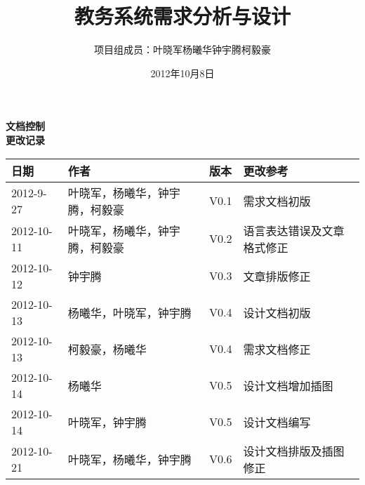 \documentclass[a4paper,12pt]{article}
\begin{document}
\begin{CJK*}{UTF8}{stzhongsong}

\title{教务系统需求分析与设计}
\author{项目组成员：叶晓军\quad 杨曦华\quad 钟宇腾\quad 柯毅豪}
\date{2012年10月8日}



\noindent \textbf{\LARGE 文档控制}\\

\noindent \textbf{\large 更改记录}\\

\begin{tabularx}{\textwidth}{|l|l|l|X|}
  \hline
  \textbf{日期} & \textbf{作者} & \textbf{版本} & \textbf{更改参考}\\
  \hline
  2012-9-27&叶晓军，杨曦华，钟宇腾，柯毅豪&V0.1&需求文档初版\\
  \hline
  2012-10-11&叶晓军，杨曦华，钟宇腾，柯毅豪&V0.2&语言表达错误及文章格式修正\\
  \hline
  2012-10-12&钟宇腾&V0.3&文章排版修正\\
  \hline
  2012-10-13&杨曦华，叶晓军，钟宇腾&V0.4&设计文档初版\\
  \hline
  2012-10-13&柯毅豪，杨曦华&V0.4&需求文档修正\\
  \hline
  2012-10-14&杨曦华&V0.5&设计文档增加插图\\
  \hline
  2012-10-14&叶晓军，钟宇腾&V0.5&设计文档编写\\
  \hline
  2012-10-21&叶晓军，杨曦华，钟宇腾&V0.6&设计文档排版及插图修正\\
  \hline
\end{tabularx}
\newpage

\tableofcontents
\newpage

\pagestyle{fancy}







\newpage
\end{CJK*}
\end{document}
